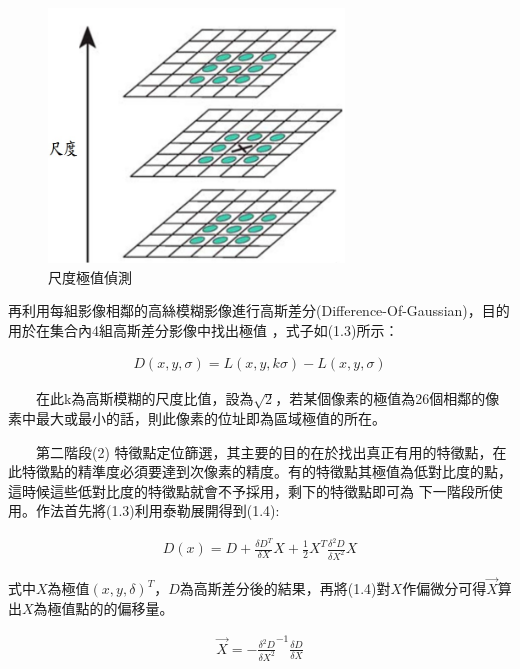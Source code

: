 \begin{figure}
\begin{center}
  \includegraphics[width=0.7\textwidth]{figures/extreme_value_detect.jpg}
  \caption{尺度極值偵測}
  \label{fig:Extreme Value Detect}
\end{center}
\end{figure}  

  再利用每組影像相鄰的高絲模糊影像進行高斯差分(Difference-Of-Gaussian)，目的用於在集合內4組高斯差分影像中找出極值
  ，式子如(1.3)所示：
    
\begin{align}
  D(x,y,\sigma) = L(x,y,k\sigma)-L(x,y,\sigma)
\end{align}

　　在此k為高斯模糊的尺度比值，設為$\sqrt{2}$，若某個像素的極值為26個相鄰的像素中最大或最小的話，則此像素的位址即為區域極值的所在。

　　第二階段(2) 特徵點定位篩選，其主要的目的在於找出真正有用的特徵點，在此特徵點的精準度必須要達到次像素的精度。有的特徵點其極值為低對比度的點，這時候這些低對比度的特徵點就會不予採用，剩下的特徵點即可為
下一階段所使用。作法首先將(1.3)利用泰勒展開得到(1.4):
 
\begin{align}
  D(x) = D + \frac{\delta D^T}{\delta X}X + \frac{1}{2}X^T\frac{\delta^2 D}{\delta X^2}X
\end{align}

   式中$X$為極值$(x,y,\delta)^T$，$D$為高斯差分後的結果，再將(1.4)對$X$作偏微分可得$\vec{X}$算出$X$為極值點的的偏移量。
   
\begin{align}
  \vec{X} = -\frac{\delta^2 D}{\delta X^2}^{-1}\frac{\delta D}{\delta X}
\end{align}   
   
